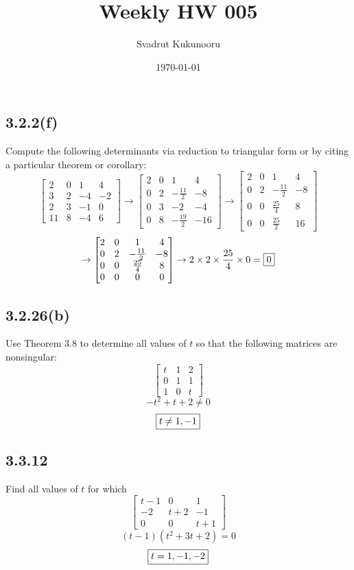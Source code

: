 \documentclass[letterpaper]{report}
\title{Weekly HW 005}
\author{Svadrut Kukunooru}
\date{\today}
\begin{document}
\begin{titlepage}
    \maketitle
\end{titlepage}
    
\subsection{3.2.2(f)}%
\label{sub:3.2.2(f)}
Compute the following determinants via reduction to triangular form or by citing a particular theorem or corollary: 
\[
\begin{bmatrix} 
    2 & 0 & 1 & 4 \\
    3 & 2 & -4 & -2 \\
    2 & 3 & -1 & 0 \\
    11 & 8 & -4 & 6 
\end{bmatrix} \to 
\begin{bmatrix} 
    2 & 0 & 1 & 4 \\
    0 & 2 & -\frac{11}{2} & -8 \\
    0 & 3 & -2 & -4 \\
    0 & 8 & -\frac{19}{2} & -16 
\end{bmatrix} \to 
\begin{bmatrix} 
    2 & 0 & 1 & 4 \\
    0 & 2 & -\frac{11}{2} & -8 \\
    0 & 0 & \frac{25}{4} & 8 \\
    0 & 0 & \frac{25}{2} & 16 
\end{bmatrix} 
\] 
\[
\to 
\begin{bmatrix} 
    2 & 0 & 1 & 4 \\
    0 & 2 & -\frac{11}{2} & -8 \\
    0 & 0 & \frac{25}{4} & 8 \\
    0 & 0 & 0 & 0
\end{bmatrix} \to 
2 \times  2 \times  \frac{25}{4} \times  0 = \fbox{0}
\] 
\subsection{3.2.26(b)}%
\label{sub:3.2.26(b)}
Use Theorem 3.8 to determine all values of $t$ so that the following matrices are nonsingular: 
\[
\begin{bmatrix} 
    t & 1 & 2 \\
    0 & 1 & 1 \\
    1 & 0 & t
\end{bmatrix} 
\] 
\[
-t^2 +t + 2 \neq 0 
\] 
\[
\fbox{$t \neq 1, -1$}
\] 
\subsection{3.3.12}%
\label{sub:3.3.12}
Find all values of $t$ for which 
\[
\begin{bmatrix} 
    t - 1 & 0 & 1 \\
    -2 & t + 2 & -1 \\
    0 & 0 & t + 1 
\end{bmatrix} 
\] 
\[
    (t-1)(t^2 +3t + 2) = 0 
\] 
\[
    \fbox{$t = 1, -1, -2$}
\] 
\end{document}
